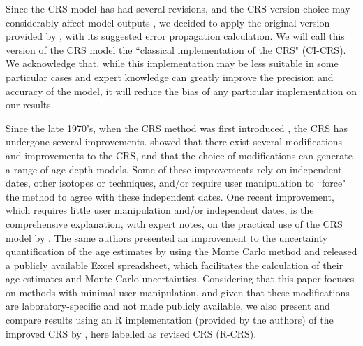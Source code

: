 \documentclass [10pt] {article}
\begin{document}
Since the CRS model has had several revisions, and the CRS version choice may considerably affect model outputs \citep{Barsanti2020}, we decided to apply the original version provided by \citet{Appleby2001}, with its suggested error propagation calculation.  We will call this version of the CRS model the ``classical implementation of the CRS" (CI-CRS). 
We acknowledge that, while this implementation may be less suitable in some particular cases and expert knowledge can greatly improve the precision and accuracy of the model, it will reduce the bias of any particular implementation on our results.


Since the late 1970's, when the CRS method was first introduced \citep{Appleby1978,Robbins1978}, the CRS has undergone several improvements.
\citet{Barsanti2020} showed that there exist several modifications and improvements to the CRS, and that the choice of modifications can generate a range of age-depth models.
Some of these improvements rely on independent dates, other isotopes or techniques, and/or require user manipulation to ``force" the method to agree with these independent dates.
One recent improvement, which requires little user manipulation and/or independent dates, is the comprehensive explanation, with expert notes, on the practical use of the CRS model by \citet{Sanchez-Cabeza2012}. 
The same authors presented an improvement to the uncertainty quantification of the age estimates by using the Monte Carlo method \citep{Sanchez-Cabeza2014} and released a publicly available Excel spreadsheet, which facilitates the calculation of their age estimates and Monte Carlo uncertainties. 
Considering that this paper focuses on methods with minimal user manipulation, and given that these modifications are laboratory-specific and not made publicly available, we also present and compare results using an R implementation (provided by the authors) of the improved CRS by \citet{Sanchez-Cabeza2014}, here labelled as revised CRS (R-CRS).

\end{document}
